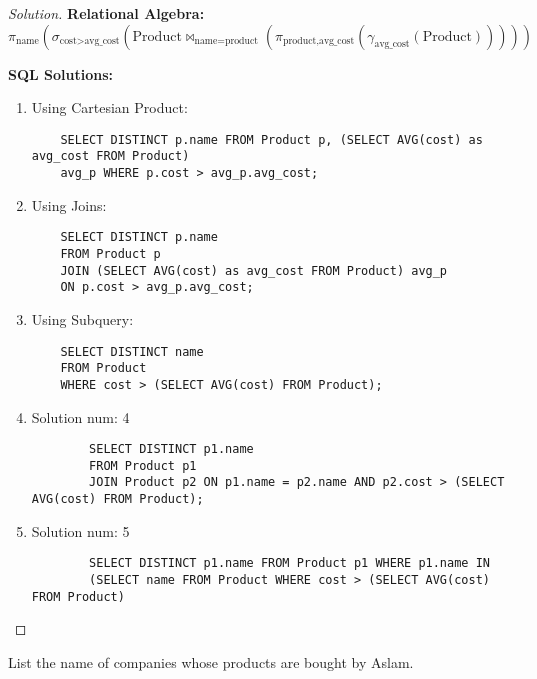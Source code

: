 \documentclass[10pt]{article}
\newenvironment{problem}[2][Problem]{\begin{trivlist}
\item[\hskip \labelsep {\bfseries #1}\hskip \labelsep {\bfseries #2.}]}{\end{trivlist}}
\begin{document}
\begin{proof}[Solution]

\textbf{Relational Algebra:}
\[
\pi_{\text{name}}\left(\sigma_{\text{cost} > \text{avg\_cost}}(\text{Product} \bowtie_{\text{name} = \text{product}} (\pi_{\text{product}, \text{avg\_cost}}(\gamma_{\text{avg\_cost}}(\text{Product}))))
\right)
\]

\textbf{SQL Solutions:}
\begin{enumerate}
    \item Using Cartesian Product:
    \begin{verbatim}
    SELECT DISTINCT p.name FROM Product p, (SELECT AVG(cost) as     avg_cost FROM Product)
    avg_p WHERE p.cost > avg_p.avg_cost;  
    \end{verbatim}

    
    \item Using Joins:
    \begin{verbatim}
    SELECT DISTINCT p.name
    FROM Product p
    JOIN (SELECT AVG(cost) as avg_cost FROM Product) avg_p
    ON p.cost > avg_p.avg_cost;
    \end{verbatim}
    
    \item Using Subquery:
    \begin{verbatim}
    SELECT DISTINCT name
    FROM Product
    WHERE cost > (SELECT AVG(cost) FROM Product);
    \end{verbatim}

    \item Solution num: 4
    \begin{verbatim}
        SELECT DISTINCT p1.name
        FROM Product p1
        JOIN Product p2 ON p1.name = p2.name AND p2.cost > (SELECT AVG(cost) FROM Product);

    \end{verbatim}

    \item Solution num: 5
    \begin{verbatim}
        SELECT DISTINCT p1.name FROM Product p1 WHERE p1.name IN
        (SELECT name FROM Product WHERE cost > (SELECT AVG(cost) FROM Product)
    \end{verbatim}
\end{enumerate}
\end{proof}





\begin{problem}{2}
List the name of companies whose products are bought by Aslam.
\end{problem}
\end{document}
